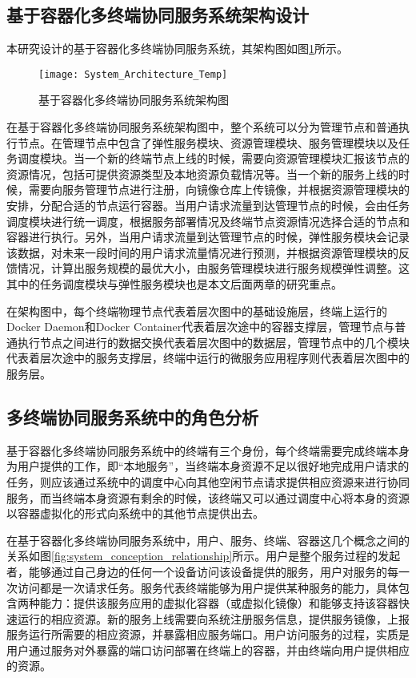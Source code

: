 \subsection{基于容器化多终端协同服务系统架构设计}
本研究设计的基于容器化多终端协同服务系统，其架构图如图\ref{fig:system_architecture}所示。
\begin{figure}[!htbp]
    \centering
    \texttt{[image: System\_Architecture\_Temp]}
    \caption{基于容器化多终端协同服务系统架构图}
    \label{fig:system_architecture}
\end{figure}

在基于容器化多终端协同服务系统架构图中，整个系统可以分为管理节点和普通执行节点。在管理节点中包含了弹性服务模块、资源管理模块、服务管理模块以及任务调度模块。当一个新的终端节点上线的时候，需要向资源管理模块汇报该节点的资源情况，包括可提供资源类型及本地资源负载情况等。当一个新的服务上线的时候，需要向服务管理节点进行注册，向镜像仓库上传镜像，并根据资源管理模块的安排，分配合适的节点运行容器。当用户请求流量到达管理节点的时候，会由任务调度模块进行统一调度，根据服务部署情况及终端节点资源情况选择合适的节点和容器进行执行。另外，当用户请求流量到达管理节点的时候，弹性服务模块会记录该数据，对未来一段时间的用户请求流量情况进行预测，并根据资源管理模块的反馈情况，计算出服务规模的最优大小，由服务管理模块进行服务规模弹性调整。这其中的任务调度模块与弹性服务模块也是本文后面两章的研究重点。

在架构图中，每个终端物理节点代表着层次图中的基础设施层，终端上运行的Docker Daemon和Docker Container代表着层次途中的容器支撑层，管理节点与普通执行节点之间进行的数据交换代表着层次图中的数据层，管理节点中的几个模块代表着层次途中的服务支撑层，终端中运行的微服务应用程序则代表着层次图中的服务层。

\subsection{多终端协同服务系统中的角色分析}

基于容器化多终端协同服务系统中的终端有三个身份，每个终端需要完成终端本身为用户提供的工作，即“本地服务”，当终端本身资源不足以很好地完成用户请求的任务，则应该通过系统中的调度中心向其他空闲节点请求提供相应资源来进行协同服务，而当终端本身资源有剩余的时候，该终端又可以通过调度中心将本身的资源以容器虚拟化的形式向系统中的其他节点提供出去。

在基于容器化多终端协同服务系统中，用户、服务、终端、容器这几个概念之间的关系如图\ref{fig:system_conception_relationship}所示。用户是整个服务过程的发起者，能够通过自己身边的任何一个设备访问该设备提供的服务，用户对服务的每一次访问都是一次请求任务。服务代表终端能够为用户提供某种服务的能力，具体包含两种能力：提供该服务应用的虚拟化容器（或虚拟化镜像）和能够支持该容器快速运行的相应资源。新的服务上线需要向系统注册服务信息，提供服务镜像，上报服务运行所需要的相应资源，并暴露相应服务端口。用户访问服务的过程，实质是用户通过服务对外暴露的端口访问部署在终端上的容器，并由终端向用户提供相应的资源。

